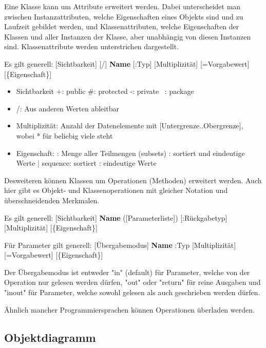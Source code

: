 Eine Klasse kann um Attribute erweitert werden. Dabei unterscheidet man zwischen Instanzattributen, welche Eigenschaften eines Objekts sind und zu Laufzeit gebildet werden, und Klassenattributen, welche Eigenschaften der Klassen und aller Instanzen der Klasse, aber unabhängig von diesen Instanzen sind. Klassenattribute werden unterstrichen dargestellt.

Es gilt generell: [Sichtbarkeit] [/] \textbf{Name} [:Typ] [Multiplizität] [=Vorgabewert] [\{Eigenschaft\}]

\begin{itemize}
    \item Sichtbarkeit
          \subitem +: public
          \subitem \#: protected
          \subitem -: private
          \subitem ~: package
    \item /: Aus anderen Werten ableitbar
    \item Multiplizität: Anzahl der Datenelemente mit [Untergrenze..Obergrenze], wobei * für beliebig viele steht
    \item {Eigenschaft}:
          : Menge aller Teilmengen (subsets)
          : sortiert und eindeutige Werte
           | {sequence}: sortiert
          : eindeutige Werte
\end{itemize}

Desweiteren können Klassen um Operationen (Methoden) erweitert werden. Auch hier gibt es Objekt- und Klassenoperationen mit gleicher Notation und überschneidenden Merkmalen.

Es gilt generell: [Sichtbarkeit] \textbf{Name} ([Parameterliste]) [:Rückgabetyp] [Multiplizität] [\{Eigenschaft\}]

Für Parameter gilt generell: [Übergabemodus] \textbf{Name} :Typ [Multiplizität] [=Vorgabewert] [\{Eigenschaft\}]

Der Übergabemodus ist entweder "in" (default) für Parameter, welche von der Operation nur gelesen werden dürfen, "out" oder "return" für reine Ausgaben und "inout" für Parameter, welche sowohl gelesen als auch geschrieben werden dürfen.

Ähnlich mancher Programmiersprachen können Operationen überladen werden.

\subsection{Objektdiagramm}


